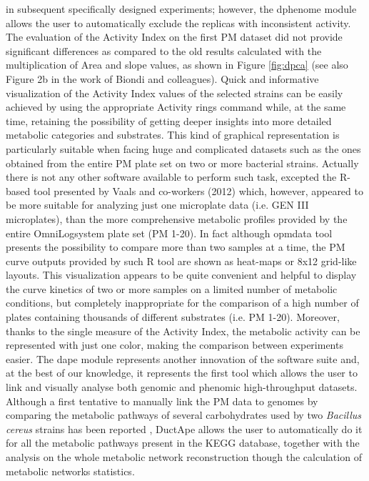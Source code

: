 in subsequent specifically designed experiments; however, the dphenome module allows the user to automatically exclude the replicas with inconsistent activity. The evaluation of the Activity Index on the first PM dataset did not provide significant differences as compared to the old results calculated with the multiplication of Area and slope values, as shown in Figure \ref{fig:dpca} (see also Figure 2b in the work of Biondi and colleagues). Quick and informative visualization of the Activity Index values of the selected strains can be easily achieved by using the appropriate Activity rings command while, at the same time, retaining the possibility of getting deeper insights into more detailed metabolic categories and substrates. This kind of graphical representation is particularly suitable when facing huge and complicated datasets such as the ones obtained from the entire PM plate set on two or more bacterial strains. Actually there is not any other software available to perform such task, excepted the R-based tool presented by Vaals and co-workers (2012) which, however, appeared to be more suitable for analyzing just one microplate data (i.e. GEN III microplates\texttrademark), than the more comprehensive metabolic profiles provided by the entire OmniLog\texttrademark system plate set (PM 1-20). In fact although opmdata tool presents the possibility to compare more than two samples at a time, the PM curve outputs provided by such R tool are shown as heat-maps or 8x12 grid-like layouts. This visualization appears to be quite convenient and helpful to display the curve kinetics of two or more samples on a limited number of metabolic conditions, but completely inappropriate for the comparison of a high number of plates containing thousands of different substrates (i.e. PM 1-20). Moreover, thanks to the single measure of the Activity Index, the metabolic activity can be represented with just one color, making the comparison between experiments easier. The dape module represents another innovation of the software suite and, at the best of our knowledge, it represents the first tool which allows the user to link and visually analyse both genomic and phenomic high-throughput datasets. Although a first tentative to manually link the PM data to genomes by comparing the metabolic pathways of several carbohydrates used by two \textit{Bacillus cereus} strains has been reported \cite{mols2007metabolic}, DuctApe allows the user to automatically do it for all the metabolic pathways present in the KEGG database, together with the analysis on the whole metabolic network reconstruction though the calculation of metabolic networks statistics.
